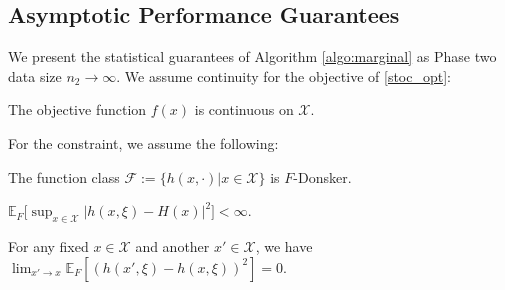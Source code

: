 \documentclass[mnsc,blindrev]{informs4} %
\newcommand{\abs}[1]{\left \vert #1 \right\vert}
\begin{document}
\subsection{Asymptotic Performance Guarantees}\label{sec:asymptotic guarantee univariate}
We present the statistical guarantees of Algorithm \ref{algo:marginal} as Phase two data size $n_2\to\infty$. We assume continuity for the objective of \eqref{stoc_opt}:
\begin{assumption}\label{continuous obj}
The objective function $f(x)$ is continuous on $\mathcal X$.
\end{assumption}
For the constraint, we assume the following:
\begin{assumption}\label{Donsker h}
The function class $\mathcal F:=\{h(x,\cdot)\vert x\in\mathcal X\}$ is $F$-Donsker.
\end{assumption}
\begin{assumption}[$L_2$-boundedness]\label{moment2}
$\mathbb E_F\big[\sup_{x\in\mathcal X}\abs{h(x,\xi)-H(x)}^2\big]<\infty$.
\end{assumption}
\begin{assumption}[$L_2$-continuity]\label{continuous constraint}
For any fixed $x\in\mathcal X$ and another $x'\in\mathcal X$, we have $\lim_{x'\to x}\mathbb E_F[(h(x',\xi)-h(x,\xi))^2]=0$.
\end{assumption}
\end{document}
